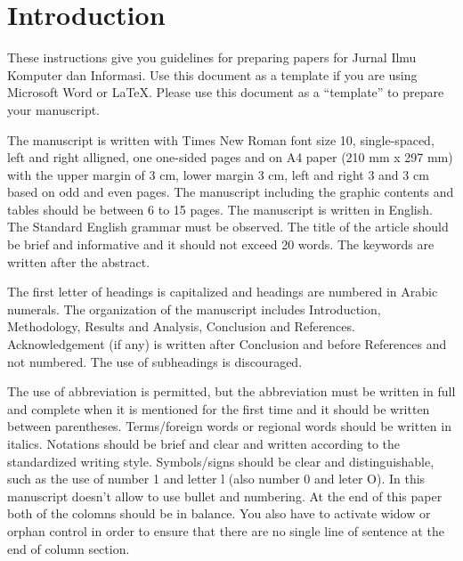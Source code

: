 \documentclass[conference, compsoc, twoside]{IEEEtran}
\begin{document}
%
\IEEEpeerreviewmaketitle
\thispagestyle{firststyle}
\iffalse
\section{Introduction}
These instructions give you guidelines for preparing papers for Jurnal Ilmu Komputer dan Informasi. Use this document as a template if you are using Microsoft Word or \LaTeX. Please use this document as a “template” to prepare your manuscript.

The manuscript is written with Times New Roman font size 10, single-spaced, left and right alligned, one one-sided pages and on A4 paper (210 mm x 297 mm) with the upper margin of 3 cm, lower margin 3 cm, left and right 3 and 3 cm based on odd and even pages. The manuscript including the graphic contents and tables should be between 6 to 15 pages. The manuscript is written in English. The Standard English grammar must be observed. The title of the article should be brief and informative and it should not exceed 20 words. The keywords are written after the abstract.

The first letter of headings is capitalized and headings are numbered in Arabic numerals. The organization of the manuscript includes Introduction, Methodology, Results and Analysis, Conclusion and References. Acknowledgement (if any) is written after Conclusion and before References and not numbered. The use of subheadings is discouraged. 

The use of abbreviation is permitted, but the abbreviation must be written in full and complete when it is mentioned for the first time and it should be written between parentheses. Terms/foreign words or regional words should be written in italics. Notations should be brief and clear and written according to the standardized writing style. Symbols/signs should be clear and distinguishable, such as the use of number 1 and letter l (also number 0 and leter O). In this manuscript doesn’t allow to use bullet and numbering. At the end of this paper both of the colomns should be in balance. You also have to activate widow or orphan control in order to ensure that there are no single line of sentence at the end of column section.     
\end{document}
